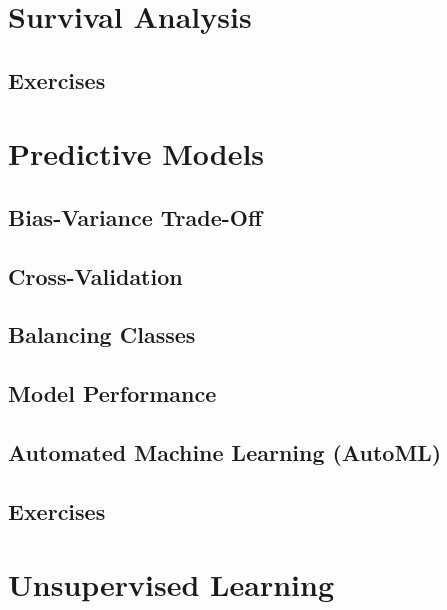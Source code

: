 \documentclass[]{book}
\begin{document}
\hypertarget{surv-anal}{%
\chapter{Survival Analysis}\label{surv-anal}}

\hypertarget{exercises-9}{%
\section{Exercises}\label{exercises-9}}

\hypertarget{pred-mod}{%
\chapter{Predictive Models}\label{pred-mod}}

\hypertarget{bias-variance-trade-off}{%
\section{Bias-Variance Trade-Off}\label{bias-variance-trade-off}}

\hypertarget{cross-validation}{%
\section{Cross-Validation}\label{cross-validation}}

\hypertarget{balancing-classes}{%
\section{Balancing Classes}\label{balancing-classes}}

\hypertarget{model-performance}{%
\section{Model Performance}\label{model-performance}}

\hypertarget{automated-machine-learning-automl}{%
\section{Automated Machine Learning (AutoML)}\label{automated-machine-learning-automl}}

\hypertarget{exercises-10}{%
\section{Exercises}\label{exercises-10}}

\hypertarget{unsup-lrn}{%
\chapter{Unsupervised Learning}\label{unsup-lrn}}
\end{document}
